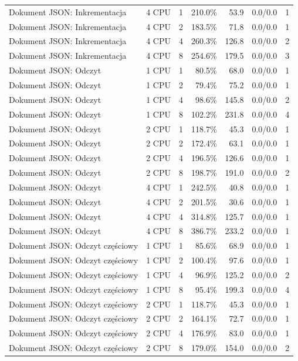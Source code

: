 \begin{table}[ht]
{\begin{tabular}{llcrrcc}
Dokument JSON: Inkrementacja & 4 CPU & 1 & 210.0\% & 53.9 & 0.0/0.0 & 1 \\
Dokument JSON: Inkrementacja & 4 CPU & 2 & 183.5\% & 71.8 & 0.0/0.0 & 1 \\
Dokument JSON: Inkrementacja & 4 CPU & 4 & 260.3\% & 126.8 & 0.0/0.0 & 2 \\
Dokument JSON: Inkrementacja & 4 CPU & 8 & 254.6\% & 179.5 & 0.0/0.0 & 3 \\
Dokument JSON: Odczyt & 1 CPU & 1 & 80.5\% & 68.0 & 0.0/0.0 & 1 \\
Dokument JSON: Odczyt & 1 CPU & 2 & 79.4\% & 75.2 & 0.0/0.0 & 1 \\
Dokument JSON: Odczyt & 1 CPU & 4 & 98.6\% & 145.8 & 0.0/0.0 & 2 \\
Dokument JSON: Odczyt & 1 CPU & 8 & 102.2\% & 231.8 & 0.0/0.0 & 4 \\
Dokument JSON: Odczyt & 2 CPU & 1 & 118.7\% & 45.3 & 0.0/0.0 & 1 \\
Dokument JSON: Odczyt & 2 CPU & 2 & 172.4\% & 63.1 & 0.0/0.0 & 1 \\
Dokument JSON: Odczyt & 2 CPU & 4 & 196.5\% & 126.6 & 0.0/0.0 & 1 \\
Dokument JSON: Odczyt & 2 CPU & 8 & 198.7\% & 191.0 & 0.0/0.0 & 2 \\
Dokument JSON: Odczyt & 4 CPU & 1 & 242.5\% & 40.8 & 0.0/0.0 & 1 \\
Dokument JSON: Odczyt & 4 CPU & 2 & 201.5\% & 30.6 & 0.0/0.0 & 1 \\
Dokument JSON: Odczyt & 4 CPU & 4 & 314.8\% & 125.7 & 0.0/0.0 & 1 \\
Dokument JSON: Odczyt & 4 CPU & 8 & 386.7\% & 233.2 & 0.0/0.0 & 1 \\
Dokument JSON: Odczyt częściowy & 1 CPU & 1 & 85.6\% & 68.9 & 0.0/0.0 & 1 \\
Dokument JSON: Odczyt częściowy & 1 CPU & 2 & 100.4\% & 97.6 & 0.0/0.0 & 1 \\
Dokument JSON: Odczyt częściowy & 1 CPU & 4 & 96.9\% & 125.2 & 0.0/0.0 & 2 \\
Dokument JSON: Odczyt częściowy & 1 CPU & 8 & 95.4\% & 199.3 & 0.0/0.0 & 4 \\
Dokument JSON: Odczyt częściowy & 2 CPU & 1 & 118.7\% & 45.3 & 0.0/0.0 & 1 \\
Dokument JSON: Odczyt częściowy & 2 CPU & 2 & 164.1\% & 72.7 & 0.0/0.0 & 1 \\
Dokument JSON: Odczyt częściowy & 2 CPU & 4 & 176.9\% & 83.0 & 0.0/0.0 & 1 \\
Dokument JSON: Odczyt częściowy & 2 CPU & 8 & 179.0\% & 154.0 & 0.0/0.0 & 2 \\

\end{tabular}}
\end{table}
